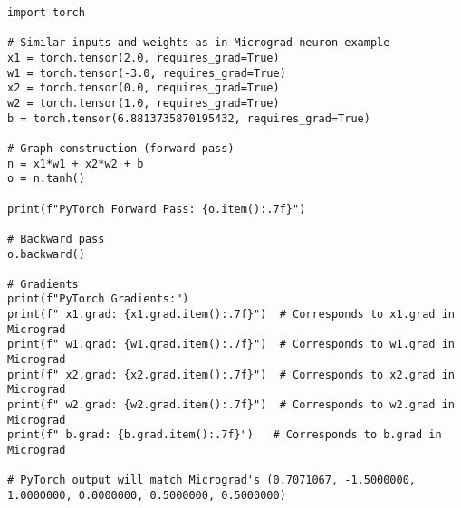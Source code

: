 \begin{lstlisting}[caption={PyTorch Equivalent Example for a Neuron}] 
import torch

# Similar inputs and weights as in Micrograd neuron example
x1 = torch.tensor(2.0, requires_grad=True) 
w1 = torch.tensor(-3.0, requires_grad=True) 
x2 = torch.tensor(0.0, requires_grad=True) 
w2 = torch.tensor(1.0, requires_grad=True) 
b = torch.tensor(6.8813735870195432, requires_grad=True)

# Graph construction (forward pass)
n = x1*w1 + x2*w2 + b 
o = n.tanh()

print(f"PyTorch Forward Pass: {o.item():.7f}")

# Backward pass
o.backward()

# Gradients
print(f"PyTorch Gradients:") 
print(f" x1.grad: {x1.grad.item():.7f}")  # Corresponds to x1.grad in Micrograd 
print(f" w1.grad: {w1.grad.item():.7f}")  # Corresponds to w1.grad in Micrograd 
print(f" x2.grad: {x2.grad.item():.7f}")  # Corresponds to x2.grad in Micrograd 
print(f" w2.grad: {w2.grad.item():.7f}")  # Corresponds to w2.grad in Micrograd 
print(f" b.grad: {b.grad.item():.7f}")   # Corresponds to b.grad in Micrograd

# PyTorch output will match Micrograd's (0.7071067, -1.5000000, 1.0000000, 0.0000000, 0.5000000, 0.5000000)
\end{lstlisting}

